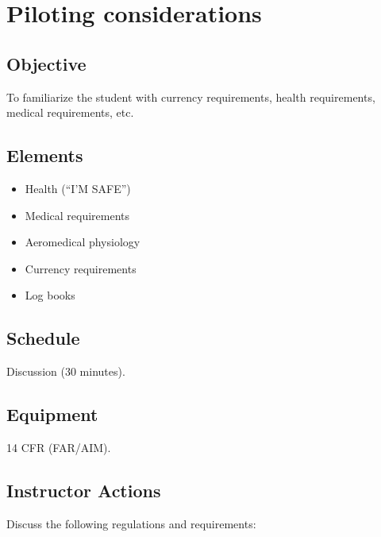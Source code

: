 \chapter{Piloting considerations}

\section{Objective}

To familiarize the student with currency requirements, health requirements,
medical requirements, etc.

\section{Elements}

\begin{itemize}
  \item Health (``I'M SAFE'')
  \item Medical requirements
  \item Aeromedical physiology
  \item Currency requirements
  \item Log books
\end{itemize}

\section{Schedule}

Discussion (30 minutes).

\section{Equipment}

14 CFR (FAR/AIM).

\section{Instructor Actions}

Discuss the following regulations and requirements:

